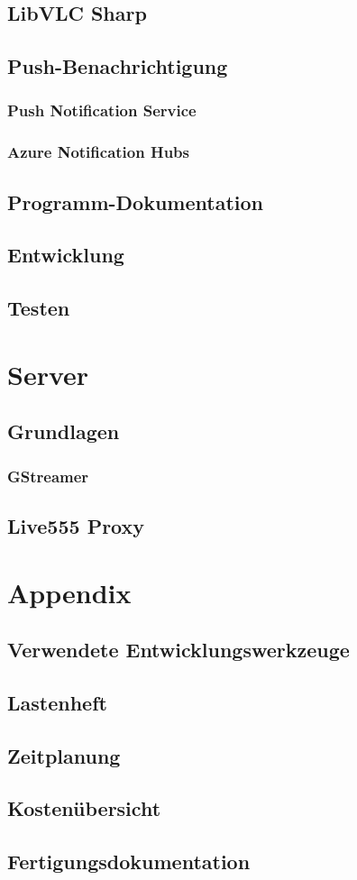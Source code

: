 \documentclass[a4paper, 12pt, twoside, openright
]{memoir}
\begin{document}
\chapter{LibVLC Sharp}
\chapter{Push-Benachrichtigung}
\section{Push Notification Service}
\section{Azure Notification Hubs}
\chapter{Programm-Dokumentation}

\chapter{Entwicklung}
\chapter{Testen}

\part{Server}
\chapter{Grundlagen}
\section{GStreamer}
\chapter{Live555 Proxy}

\appendix
\printacronyms[heading=chapter,name=Abkürzungen]
\printbibliography

\part{Appendix}
\chapter{Verwendete Entwicklungswerkzeuge}
\chapter{Lastenheft}
\chapter{Zeitplanung}
\chapter{Kostenübersicht}
\chapter{Fertigungsdokumentation}
\end{document}
